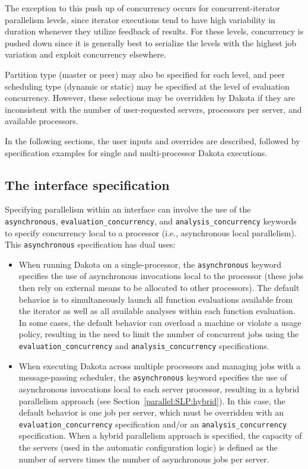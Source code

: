 The exception to this push up of concurrency occurs for
concurrent-iterator parallelism levels, since iterator executions tend
to have high variability in duration whenever they utilize feedback of
results.  For these levels, concurrency is pushed down since it is
generally best to serialize the levels with the highest job variation
and exploit concurrency elsewhere.

Partition type (master or peer) may also be specified for each level, 
and peer scheduling type (dynamic or static) may be specified at the 
level of evaluation concurrency. However, these selections may be 
overridden by Dakota if they are inconsistent with the number of 
user-requested servers, processors per server, and available processors.

In the following sections, the user inputs and overrides are
described, followed by specification examples for single and
multi-processor Dakota executions.

\subsection{The interface specification}\label{parallel:spec:interface}

Specifying parallelism within an interface can involve the use of the
\texttt{asynchronous}, \texttt{evaluation\_concurrency}, and
\texttt{analysis\_concurrency} keywords to specify concurrency local
to a processor (i.e., asynchronous local parallelism). This
\texttt{asynchronous} specification has dual uses:

\begin{itemize}
\item When running Dakota on a single-processor, the
  \texttt{asynchronous} keyword specifies the use of asynchronous
  invocations local to the processor (these jobs then rely on external
  means to be allocated to other processors). The default behavior is
  to simultaneously launch all function evaluations available from the
  iterator as well as all available analyses within each function
  evaluation. In some cases, the default behavior can overload a
  machine or violate a usage policy, resulting in the need to limit
  the number of concurrent jobs using the
  \texttt{evaluation\_concurrency} and \texttt{analysis\_concurrency}
  specifications. 

\item When executing Dakota across multiple processors and managing
  jobs with a message-passing scheduler, the \texttt{asynchronous}
  keyword specifies the use of asynchronous invocations local to each
  server processor, resulting in a hybrid parallelism approach (see
  Section~\ref{parallel:SLP:hybrid}). In this case, the default
  behavior is one job per server, which must be overridden with an
  \texttt{evaluation\_concurrency} specification and/or an
  \texttt{analysis\_concurrency} specification. When a hybrid
  parallelism approach is specified, the capacity of the servers (used
  in the automatic configuration logic) is defined as the number of
  servers times the number of asynchronous jobs per server.
\end{itemize}


